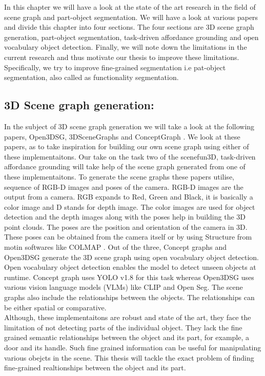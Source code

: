 In this chapter we will have a look at the 
state of the art research in the field of scene
 graph and part-object segmentation. We will have a look 
 at various papers and divide this chapter into four sections.
 The four sections are 3D scene graph generation, part-object segmentation,
 task-driven affordance grounding and open vocabulary object detection.
 Finally, we will note down the limitations in the current
 research and thus motivate our thesis to improve these limitations. 
 Specifically, we try to improve fine-grained segmentation i.e
 pat-object segmentation, also called as functionality segmentation.
 \subsection{3D Scene graph generation:}
In the subject of 3D scene graph generation we will take a look at the following papers, 
Open3DSG\cite{koch2024open3dsgopenvocabulary3dscene}, 3DSceneGraphs \cite{armeni20193d} and ConceptGraph \cite{gu2023conceptgraphsopenvocabulary3dscene}. 
We look at these papers, as to take inspiration for building our own scene graph 
using either of these implementaitons. Our take on the task two of the scenefun3D, task-driven affordance grounding will 
take help of the scene graph generated from one of these implementaitons.
To generate the scene graphs these papers utilise,
sequence of RGB-D images and poses of the camera. RGB-D images are the output from a camera.
RGB expands to Red, Green and Black, it is basically a color image and D stands for depth image. The color images
are used for object detection and the depth images along with the poses help in building the 3D point clouds. The poses are
the position and orientation of the camera in 3D. These poses can be obtained from the camera itself or by using Structure from motin softwares like
COLMAP \cite{schoenberger2016mvs} \cite{schoenberger2016sfm}. Out of the three, Concept graphs and 
Open3DSG generate the 3D scene graph using open vocabulary object detection. Open vocabulary
object detection enables the model to detect unseen objects at runtime. Concept graph uses YOLO v1.8 for this task whereas Open3DSG uses 
various vision language models (VLMs) like CLIP and Open Seg.
 The scene graphs also include the relationships between the 
objects. The relationships can be either spatial or comparative. \\
Although, these implementaitons are robust and state of the art, they face the limitation of not detecting
parts of the individual object. They lack the fine grained semantic relationships between the object and its part, for example, a door and its handle.
Such fine grained information can be useful for manipulating various obejcts in the scene. This  thesis will tackle the exact problem of 
finding fine-grained realtionships between the object and its part.

